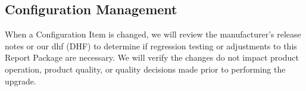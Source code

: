 \subsection{Configuration Management}
When a Configuration Item is changed, we will review the manufacturer's release
notes or our \Gls{dhf} (DHF) to determine if regression testing or
adjustments to this Report Package are necessary. We will verify the changes do
not impact product operation, product quality, or quality decisions made prior
to performing the upgrade.
